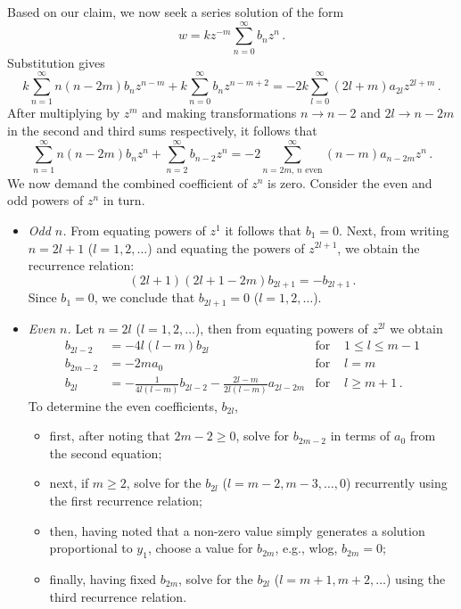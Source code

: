 \documentclass{article}
\theoremstyle{plain}\theoremheaderfont{\normalfont\itshape}\theorembodyfont{\rmfamily}\theoremseparator{.}\newtheorem*{rem}{Remark}\newtheorem*{ex}{Example}\newtheorem*{proof}{Proof}\newtheorem*{altp}{Alternative proof}
\theoremstyle{plain}\theoremheaderfont{\normalfont\bfseries}\theorembodyfont{\rmfamily}\theoremseparator{.}\newtheorem{thm}{Theorem}[section]\newtheorem{lem}[thm]{Lemma}\newtheorem{prop}[thm]{Proposition}\newtheorem*{cor}{Corollary}\newtheorem{defn}[thm]{Definition}\newtheorem{clm}[thm]{Claim}\newtheorem{clminproof}{Claim}
\theoremstyle{break}\theoremheaderfont{\normalfont\itshape}\theorembodyfont{\rmfamily}\theoremseparator{.\medskip}\newtheorem*{proofskip}{Proof}\newtheorem*{exs}{Examples}\newtheorem*{rems}{Remarks}
\theoremstyle{break}\theoremheaderfont{\normalfont\bfseries}\theorembodyfont{\rmfamily}\theoremseparator{.\medskip}\newtheorem{lemskip}[thm]{Lemma}\newtheorem{defnskip}[thm]{Definition}\newtheorem{propskip}[thm]{Proposition}\newtheorem{thmskip}[thm]{Theorem}
\numberwithin{equation}{section}
\begin{document}
	Based on our claim, we now seek a series solution of the form
	\[w=kz^{-m}\sum_{n=0}^{\infty}b_nz^n\,.\]
	Substitution gives
	\[k\sum_{n=1}^{\infty}n(n-2m)b_nz^{n-m}+k\sum_{n=0}^{\infty}b_nz^{n-m+2}=-2k\sum_{l=0}^{\infty}(2l+m)a_{2l}z^{2l+m}\,.\]
	After multiplying by \(z^m\) and making transformations \(n\to n-2\) and \(2l\to n-2m\) in the second and third sums respectively, it follows that
	\[\sum_{n=1}^{\infty}n(n-2m)b_nz^n+\sum_{n=2}^{\infty}b_{n-2}z^n=-2\sum_{n=2m,\, n\text{ even}}^{\infty}(n-m)a_{n-2m}z^n\,.\]
	We now demand the combined coefficient of \(z^n\) is zero. Consider the even and odd powers of \(z^n\) in turn.
	\begin{itemize}
		\item \textit{Odd \(n\).} From equating powers of \(z^1\) it follows that \(b_1=0\). Next, from writing \(n=2l+1\) (\(l=1,2,\dots\)) and equating the powers of \(z^{2l+1}\), we obtain the recurrence relation:
		\[(2l+1)(2l+1-2m)b_{2l+1}=-b_{2l+1}\,.\]
		Since \(b_1=0\), we conclude that \(b_{2l+1}=0\) (\(l=1,2,\dots\)).

		\item \textit{Even \(n\).} Let \(n=2l\) (\(l=1,2,\dots\)), then from equating powers of \(z^{2l}\) we obtain
		\begin{align*}
			b_{2l-2}&=-4l(l-m)b_{2l} & \text{for }& 1\le l\le m-1\\
			b_{2m-2}&=-2ma_0 & \text{for } &l=m\\
			b_{2l}&=-\frac{1}{4l(l-m)}b_{2l-2}-\frac{2l-m}{2l(l-m)}a_{2l-2m} & \text{for }&l\ge m+1\,.
		\end{align*}
		To determine the even coefficients, \(b_{2l}\),
		\begin{itemize}
			\item first, after noting that \(2m-2\ge 0\), solve for \(b_{2m-2}\) in terms of \(a_0\) from the second equation;
			\item next, if \(m\ge 2\), solve for the \(b_{2l}\) (\(l=m-2,m-3,\dots,0\)) recurrently using the first recurrence relation;
			\item then, having noted that a non-zero value simply generates a solution proportional to \(y_1\), choose a value for \(b_{2m}\), e.g., wlog, \(b_{2m}=0\);
			\item finally, having fixed \(b_{2m}\), solve for the \(b_{2l}\) (\(l=m+1,m+2,\dots\)) using the third recurrence relation.
		\end{itemize}
	\end{itemize}
\end{document}
